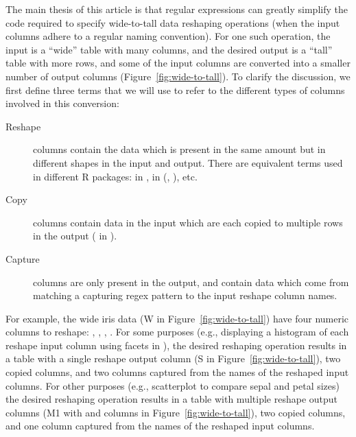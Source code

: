 The main thesis of this article is that regular expressions can greatly
simplify the code required to specify wide-to-tall data reshaping
operations (when the input columns adhere to a regular naming convention).
For one such operation, the input is a ``wide'' table with
many columns, and the desired output is a ``tall'' table with more
rows, and some of the input columns are converted into a smaller number of
output columns (Figure~\ref{fig:wide-to-tall}). To clarify the
discussion, we first define three terms that we will use to refer to
the different types of columns involved in this conversion:
\begin{description}
\item[Reshape] columns contain the data which is present in the same
  amount but in different shapes in the input and output. There are
  equivalent terms used in different R packages:  in
  ,  in 
  (, ), etc.
\item[Copy] columns contain data in the input which are each copied to
  multiple rows in the output ( in ).
\item[Capture] columns are only present in the output, and contain
  data which come from matching a
  capturing regex pattern to the input reshape column names.
\end{description}
For example, the wide iris data (W in Figure~\ref{fig:wide-to-tall})
have four numeric columns to reshape: ,
, , . For some
purposes (e.g., displaying a histogram of each reshape input column
using facets in ), the desired reshaping operation
results in a table with a single reshape output column (S in
Figure~\ref{fig:wide-to-tall}), two copied columns, and two columns
captured from the names of the reshaped input columns. For other
purposes (e.g., scatterplot to compare sepal and petal sizes) the
desired reshaping operation results in a table with multiple reshape
output columns (M1 with  and  columns in
Figure~\ref{fig:wide-to-tall}), two copied columns, and one column
captured from the names of the reshaped input columns. 

